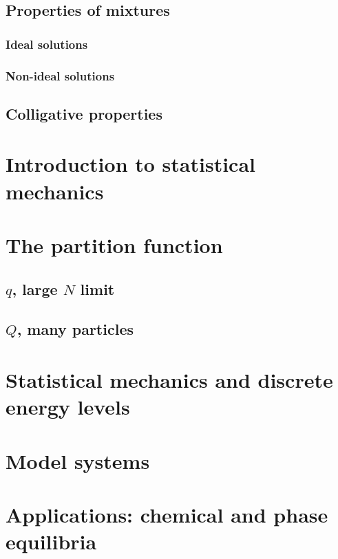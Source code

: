 \documentclass{article}
\numberwithin{theorem}{section}
\numberwithin{corollary}{section}
\numberwithin{postulate}{section}
\numberwithin{lemma}{section}
\numberwithin{definition}{section}
\begin{document}
\subsection{Properties of mixtures}

\subsubsection{Ideal solutions}

\subsubsection{Non-ideal solutions}

\subsection{Colligative properties}

\section{Introduction to statistical mechanics}

\section{The partition function}

\subsection{$q$, large $N$ limit}

\subsection{$Q$, many particles}

\section{Statistical mechanics and discrete energy levels}

\section{Model systems}

\section{Applications: chemical and phase equilibria}
\end{document}

